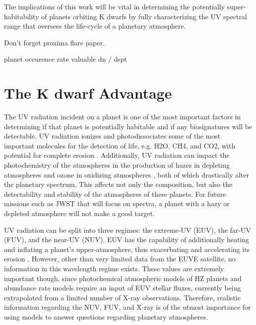 \documentclass[twocolumn]{aastex62}
\begin{document}
The implications of this work will be vital in determining the potentially super-habitability of planets orbiting K dwarfs by fully characterizing the UV spectral range that oversees the life-cycle of a planetary atmosphere.

Don't forget proxima flare paper.


planet occurence rate valuable
dn / dspt





\section{The K dwarf Advantage}\label{sec:advantage}
The UV radiation incident on a planet is one of the most important factors in determining if that planet is potentially habitable and if any biosignatures will be detectable. UV radiation ionizes and photodissociates some of the most important molecules for the detection of life, e.g. H2O, CH4, and CO2, with potential for complete erosion \citep[e.g.][]{Kasting1993, Lichtenegger2010, Segura2010, Hu2012}. Additionally, UV radiation can impact the photochemistry of the atmospheres in the production of hazes in depleting atmospheres \citep{Zerkle2012, Arney2017}
and ozone in oxidizing atmospheres \citep{Segura2003, Segura2005}, both of which drastically alter the planetary spectrum. This affects not only the composition, but also the detectability and stability of the atmospheres of these planets. For future missions such as JWST that will focus on spectra, a planet with a hazy or depleted atmosphere will not make a good target.

UV radiation can be split into three regimes: the extreme-UV (EUV), the far-UV (FUV), and the near-UV (NUV). EUV has the capability of additionally heating and inflating a planet’s upper-atmosphere, thus exacerbating and accelerating its erosion \citep{Koskinen2010, Lammer2007}. However, other than very limited data from the EUVE satellite, no information in this wavelength regime exists. These values are extremely important though, since photochemical atmospheric models of HZ planets and abundance rate models require an input of EUV stellar fluxes, currently being extrapolated from a limited number of X-ray observations. Therefore, realistic information regarding the NUV, FUV, and X-ray is of the utmost importance for using models to answer questions regarding planetary atmospheres. 
\end{document}
